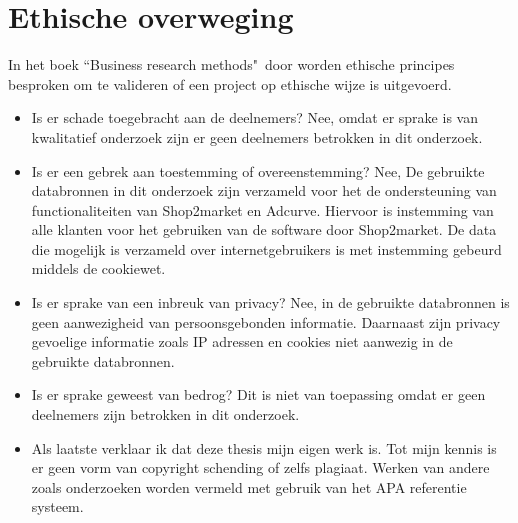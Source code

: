 \clearpage

\section{Ethische overweging}

In het boek ``Business research methods"\ door \textcite{bryman2015business} worden ethische principes besproken om te valideren of een project op ethische wijze is uitgevoerd.

\begin{itemize}
    \item Is er schade toegebracht aan de deelnemers? Nee, omdat er sprake is van kwalitatief onderzoek zijn er geen deelnemers betrokken in dit onderzoek.
    \item Is er een gebrek aan toestemming of overeenstemming? Nee, De gebruikte databronnen in dit onderzoek zijn verzameld voor het de ondersteuning van functionaliteiten van Shop2market en Adcurve. Hiervoor is instemming van alle klanten voor het gebruiken van de software door Shop2market. De data die mogelijk is verzameld over internetgebruikers is met instemming gebeurd middels de cookiewet.
    \item Is er sprake van een inbreuk van privacy? Nee, in de gebruikte databronnen is geen aanwezigheid van persoonsgebonden informatie. Daarnaast zijn privacy gevoelige informatie zoals IP adressen en cookies niet aanwezig in de gebruikte databronnen.
    \item Is er sprake geweest van bedrog? Dit is niet van toepassing omdat er geen deelnemers zijn betrokken in dit onderzoek.
    \item Als laatste verklaar ik dat deze thesis mijn eigen werk is. Tot mijn kennis is er geen vorm van copyright schending of zelfs plagiaat. Werken van andere zoals onderzoeken worden vermeld met gebruik van het APA referentie systeem.
\end{itemize}